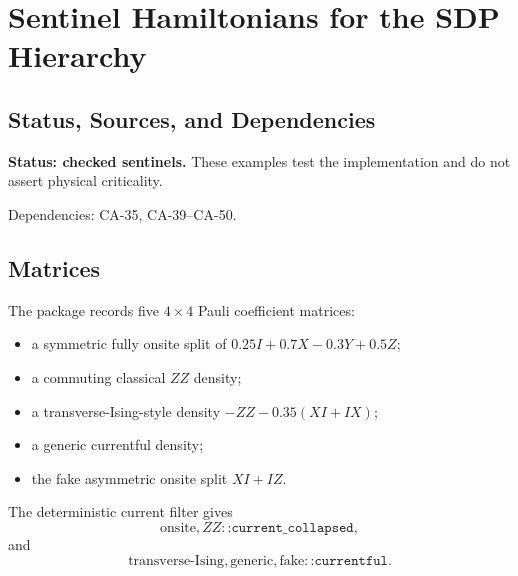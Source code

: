 
\section{Sentinel Hamiltonians for the SDP Hierarchy}
\label{sec:qubit-sdp-sentinel-hamiltonians}

\subsection{Status, Sources, and Dependencies}

\textbf{Status: checked sentinels.}  These examples test the implementation and
do not assert physical criticality.

Dependencies: CA-35, CA-39--CA-50.


\subsection{Matrices}

The package records five \(4\times4\) Pauli coefficient matrices:

\begin{itemize}
\item a symmetric fully onsite split of \(0.25I+0.7X-0.3Y+0.5Z\);
\item a commuting classical \(ZZ\) density;
\item a transverse-Ising-style density \(-ZZ-0.35(XI+IX)\);
\item a generic currentful density;
\item the fake asymmetric onsite split \(XI+IZ\).
\end{itemize}

The deterministic current filter gives
\[
  \text{onsite},ZZ:\texttt{:current\_collapsed},
\]
and
\[
  \text{transverse-Ising},\text{generic},\text{fake}:
  \texttt{:currentful}.
\]

